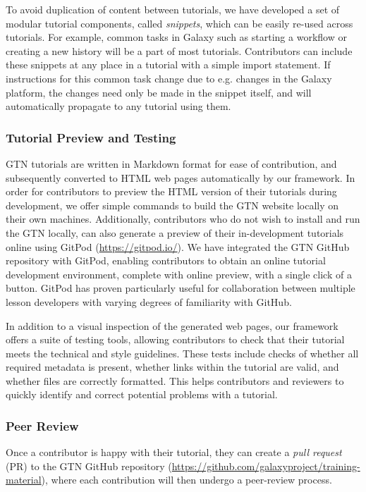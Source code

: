 \documentclass[10pt,letterpaper]{article}
\begin{document}
To avoid duplication of content between tutorials, we have developed a set of modular tutorial components, called \emph{snippets}, which can be easily re-used across tutorials.
For example, common tasks in Galaxy such as starting a workflow or creating a new history will be a part of most tutorials. Contributors can include these snippets at any place in a tutorial with a simple import statement. If instructions for this common task change due to e.g. changes in the Galaxy platform, the changes need only be made in the snippet itself, and will automatically propagate to any tutorial using them. 

\subsubsection*{Tutorial Preview and Testing}
GTN tutorials are written in Markdown format for ease of contribution, and subsequently converted to HTML web pages automatically by our framework. In order for contributors to preview the HTML version of their tutorials during development, we offer simple commands to build the GTN website locally on their own machines. Additionally, contributors who do not wish to install and run the GTN locally, can also generate a preview of their in-development tutorials online using GitPod (\url{https://gitpod.io/}). 
We have integrated the GTN GitHub repository with GitPod, enabling contributors to obtain an online tutorial development environment, complete with online preview, with a single click of a button. GitPod has proven particularly useful for collaboration between multiple lesson developers with varying degrees of familiarity with GitHub.    

In addition to a visual inspection of the generated web pages, our framework offers a suite of testing tools, allowing contributors to check that their tutorial meets the technical and style guidelines.
These tests include checks of whether all required metadata is present, whether links within the tutorial are valid, and whether files are correctly formatted.
This helps contributors and reviewers to quickly identify and correct potential problems with a tutorial.


\subsubsection*{Peer Review}

Once a contributor is happy with their tutorial, they can create a \emph{pull request} (PR) to the GTN GitHub repository (\url{https://github.com/galaxyproject/training-material}), where each contribution will then undergo a peer-review process.
\end{document}
